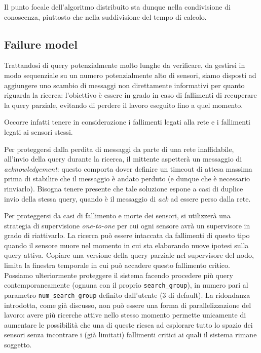 \documentclass{llncs}
\begin{document}
Il punto focale dell'algoritmo distribuito sta dunque nella
condivisione di conoscenza, piuttosto che nella suddivisione del tempo di calcolo.

\subsection{Failure model}
Trattandosi di query potenzialmente molto lunghe da verificare,
da gestirsi in modo sequenziale su un numero potenzialmente alto di sensori,
siamo disposti ad aggiungere uno scambio di messaggi non direttamente
informativi per quanto riguarda la ricerca: l'obiettivo è essere in grado
in caso di fallimenti di recuperare la query parziale,
evitando di perdere il lavoro eseguito fino a quel momento.

Occorre infatti tenere in considerazione i fallimenti legati alla rete e i
fallimenti legati ai sensori stessi.

Per proteggersi dalla perdita di messaggi da parte di una rete inaffidabile,
all'invio della query durante la ricerca, il mittente aspetterà un messaggio
di \emph{acknowledgement}: questo comporta dover definire un timeout
di attesa massima prima di stabilire che il messaggio è andato perduto
(e dunque che è necessario rinviarlo).
Bisogna tenere presente che
tale soluzione espone a casi di duplice invio della stessa query,
quando è il messaggio di \emph{ack} ad essere perso dalla rete.

Per proteggersi da casi di fallimento e morte dei sensori,
si utilizzerà una strategia di supervisione \emph{one-to-one}
per cui ogni sensore avrà un supervisore in grado di riattivarlo.
La ricerca può essere intaccata da fallimenti di questo tipo
quando il sensore muore nel momento in cui sta elaborando
nuove ipotesi sulla query attiva.
Copiare una versione della query parziale nel supervisore del nodo,
limita la finestra temporale in cui può accadere questo fallimento
critico.
Possiamo ulteriormente proteggere il sistema facendo procedere
più query contemporaneamente (ognuna con il proprio \texttt{search\_group}),
in numero pari al parametro \texttt{num\_search\_group}
definito dall'utente (3 di default).
La ridondanza introdotta, come già discusso,
non può essere una forma di parallelizzazione del lavoro: avere
più ricerche attive nello stesso momento permette unicamente di
aumentare le possibilità che una di queste riesca ad esplorare
tutto lo spazio dei sensori senza incontrare i (già limitati)
fallimenti critici ai quali il sistema rimane soggetto.
\end{document}
